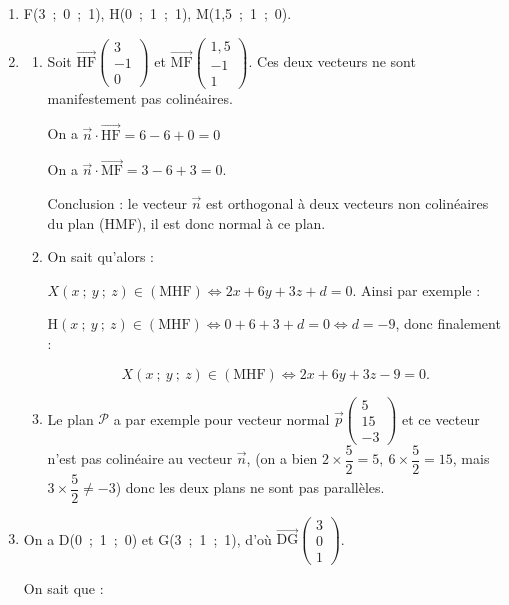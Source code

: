 \documentclass[10pt]{article}
\providecommand{\vect}[1]{\overrightarrow{#1}}
\begin{document}
\begin{enumerate}
\item 
F(3~;~0~;~1), \: H(0~;~1~;~1), \:M(1,5~;~1~;~0).
\item 
	\begin{enumerate}
		\item 
	
Soit $\vect{\text{HF}}\begin{pmatrix}3\\-1\\0\end{pmatrix}$ et $\vect{\text{MF}}\begin{pmatrix}1,5\\-1\\1\end{pmatrix}$. Ces deux vecteurs ne sont manifestement pas colinéaires.

On a $\vect{n} \cdot \vect{\text{HF}} = 6 - 6 + 0 = 0$

On a $\vect{n} \cdot \vect{\text{MF}} = 3 - 6 + 3 = 0$.

Conclusion : le vecteur $\vect{n}$ est orthogonal à deux vecteurs non colinéaires du plan  (HMF), il est donc normal à ce plan.
		\item 
On sait qu'alors :

$X(x~;~y~;~z) \in  (\text{MHF}) \iff 2x + 6y + 3z + d = 0$. Ainsi par exemple :

$\text{H}(x~;~y~;~z) \in  (\text{MHF}) \iff 0 + 6 + 3 + d = 0 \iff d = - 9$, donc finalement :

\[X(x~;~y~;~z) \in  (\text{MHF}) \iff 2x + 6y + 3z - 9 = 0.\]
		\item 
Le plan $\mathcal{P}$ a par exemple pour vecteur normal $\vect{p}\begin{pmatrix}5\\15\\-3\end{pmatrix}$ et ce vecteur n'est pas colinéaire au vecteur $\vect{n}$, (on a bien $2 \times \dfrac52 = 5, \: 6 \times \dfrac52 = 15$, mais $3 \times \dfrac52 \ne - 3$)  donc les deux plans ne sont pas parallèles.
	\end{enumerate}
\item 
On a D(0~;~1~;~0) et G(3~;~1~;~1), d'où $\vect{\text{DG}}\begin{pmatrix}3\\0\\1\end{pmatrix}$.

On sait que :


\end{enumerate}
\end{document}
